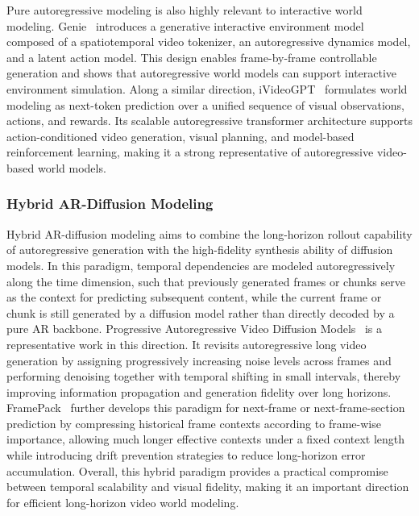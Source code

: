 \documentclass[lettersize,journal]{IEEEtran}
\begin{document}
Pure autoregressive modeling is also highly relevant to interactive world modeling. Genie~\cite{bruce2024genie} introduces a generative interactive environment model composed of a spatiotemporal video tokenizer, an autoregressive dynamics model, and a latent action model. This design enables frame-by-frame controllable generation and shows that autoregressive world models can support interactive environment simulation. Along a similar direction, iVideoGPT~\cite{wu2024ivideogpt} formulates world modeling as next-token prediction over a unified sequence of visual observations, actions, and rewards. Its scalable autoregressive transformer architecture supports action-conditioned video generation, visual planning, and model-based reinforcement learning, making it a strong representative of autoregressive video-based world models.


\subsubsection{Hybrid AR-Diffusion Modeling}
Hybrid AR-diffusion modeling aims to combine the long-horizon rollout capability of autoregressive generation with the high-fidelity synthesis ability of diffusion models. In this paradigm, temporal dependencies are modeled autoregressively along the time dimension, such that previously generated frames or chunks serve as the context for predicting subsequent content, while the current frame or chunk is still generated by a diffusion model rather than directly decoded by a pure AR backbone. Progressive Autoregressive Video Diffusion Models~\cite{xie2024progressive} is a representative work in this direction. It revisits autoregressive long video generation by assigning progressively increasing noise levels across frames and performing denoising together with temporal shifting in small intervals, thereby improving information propagation and generation fidelity over long horizons. FramePack~\cite{zhang2025frame} further develops this paradigm for next-frame or next-frame-section prediction by compressing historical frame contexts according to frame-wise importance, allowing much longer effective contexts under a fixed context length while introducing drift prevention strategies to reduce long-horizon error accumulation. Overall, this hybrid paradigm provides a practical compromise between temporal scalability and visual fidelity, making it an important direction for efficient long-horizon video world modeling.


\end{document}
